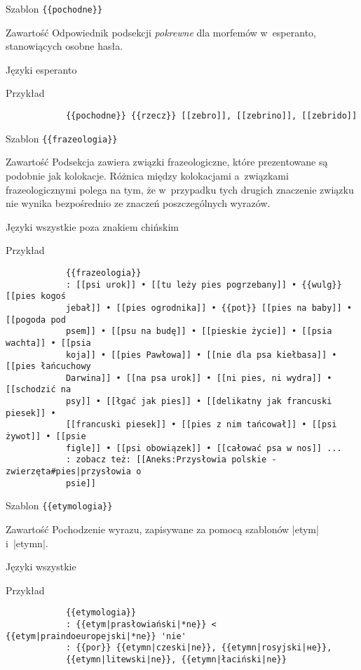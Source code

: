 \spacer
\begin{opis}
	\item[Szablon] \verb|{{pochodne}}|
	\item[Zawartość] Odpowiednik podsekcji \emph{pokrewne} dla morfemów w~esperanto, stanowiących osobne hasła.
	\item[Języki] esperanto
	\item[Przykład]
		\begin{verbatim}
			{{pochodne}} {{rzecz}} [[zebro]], [[zebrino]], [[zebrido]]
		\end{verbatim}
\end{opis}
\spacer
\begin{opis}
	\item[Szablon] \verb|{{frazeologia}}|
	\item[Zawartość] Podsekcja zawiera związki frazeologiczne, które prezentowane są podobnie jak kolokacje. Różnica między kolokacjami a~związkami frazeologicznymi polega na tym, że w~przypadku tych drugich znaczenie związku nie wynika bezpośrednio ze znaczeń poszczególnych wyrazów.
	\item[Języki] wszystkie poza znakiem chińskim
	\item[Przykład]
		\begin{verbatim}
			{{frazeologia}}
			: [[psi urok]] • [[tu leży pies pogrzebany]] • {{wulg}} [[pies kogoś
			jebał]] • [[pies ogrodnika]] • {{pot}} [[pies na baby]] • [[pogoda pod
			psem]] • [[psu na budę]] • [[pieskie życie]] • [[psia wachta]] • [[psia
			koja]] • [[pies Pawłowa]] • [[nie dla psa kiełbasa]] • [[pies łańcuchowy
			Darwina]] • [[na psa urok]] • [[ni pies, ni wydra]] • [[schodzić na
			psy]] • [[łgać jak pies]] • [[delikatny jak francuski piesek]] •
			[[francuski piesek]] • [[pies z nim tańcował]] • [[psi żywot]] • [[psie
			figle]] • [[psi obowiązek]] • [[całować psa w nos]] ...
			: zobacz też: [[Aneks:Przysłowia polskie - zwierzęta#pies|przysłowia o
			psie]]
		\end{verbatim}
\end{opis}
\spacer
\begin{opis}
	\item[Szablon] \verb|{{etymologia}}|
	\item[Zawartość] Pochodzenie wyrazu, zapisywane za pomocą szablonów \kod|{{etym}}| i~\kod|{{etymn}}|.
	\item[Języki] wszystkie
	\item[Przykład]
		\begin{verbatim}
			{{etymologia}}
			: {{etym|prasłowiański|*ne}} < {{etym|praindoeuropejski|*ne}} 'nie'
			: {{por}} {{etymn|czeski|ne}}, {{etymn|rosyjski|не}},
			{{etymn|litewski|ne}}, {{etymn|łaciński|ne}}
		\end{verbatim}
\end{opis}
